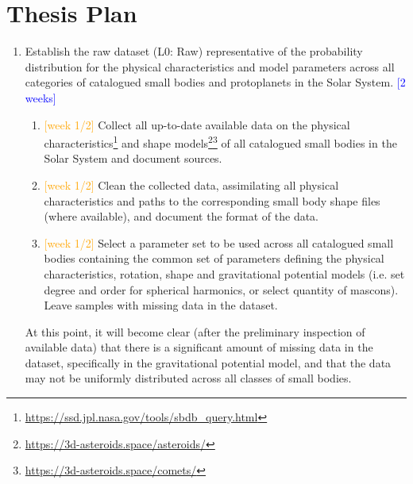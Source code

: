 \newpage\section{Thesis Plan}

\begin{enumerate}
    \item Establish the raw dataset (L0: Raw) representative of the probability distribution for the physical characteristics and model parameters across all categories of catalogued small bodies and protoplanets in the Solar System. \textcolor{blue}{[2 weeks]}
          \begin{enumerate}
              \item \textcolor{orange}{[week 1/2]} Collect all up-to-date available data on the physical characteristics\footnote{\url{https://ssd.jpl.nasa.gov/tools/sbdb_query.html}} and shape models\footnote{\label{note1}\url{https://3d-asteroids.space/asteroids/}}\footnote{\label{note2}\url{https://3d-asteroids.space/comets/}} of all catalogued small bodies in the Solar System and document sources. 
              \item \textcolor{orange}{[week 1/2]} Clean the collected data, assimilating all physical characteristics and paths to the corresponding small body shape files (where available), and document the format of the data.
              \item \textcolor{orange}{[week 1/2]} Select a parameter set to be used across all catalogued small bodies containing the common set of parameters defining the physical characteristics, rotation, shape and gravitational potential models (i.e. set degree and order for spherical harmonics, or select quantity of mascons). Leave samples with missing data in the dataset.
          \end{enumerate}
    At this point, it will become clear (after the preliminary inspection of available data) that there is a significant amount of missing data in the dataset, specifically in the gravitational potential model, and that the data may not be uniformly distributed across all classes of small bodies.


\end{enumerate}
